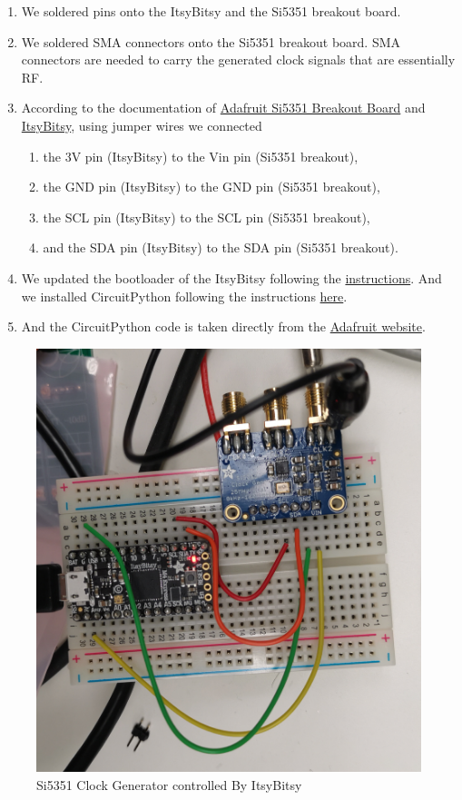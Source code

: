 \documentclass{article}
\begin{document}
\begin{enumerate}
    \item We soldered pins onto the ItsyBitsy and the Si5351 breakout board.
    \item We soldered SMA connectors onto the Si5351 breakout board.
          SMA connectors are needed to carry the generated clock signals that are essentially RF.
    \item According to the documentation of \href{https://learn.adafruit.com/adafruit-si5351-clock-generator-breakout/pinouts}{Adafruit Si5351 Breakout Board} and \href{https://cdn-learn.adafruit.com/downloads/pdf/introducing-adafruit-itsybitsy-m4.pdf}{ItsyBitsy}, using jumper wires we connected
          \begin{enumerate}
              \item the 3V pin (ItsyBitsy) to the Vin pin (Si5351 breakout),
              \item the GND pin (ItsyBitsy) to the GND pin (Si5351 breakout),
              \item the SCL pin (ItsyBitsy) to the SCL pin (Si5351 breakout),
              \item and the SDA pin (ItsyBitsy) to the SDA pin (Si5351 breakout).
          \end{enumerate}
    \item We updated the bootloader of the ItsyBitsy following the \href{https://learn.adafruit.com/introducing-adafruit-itsybitsy-m4/update-the-uf2-bootloader}{instructions}.
          And we installed CircuitPython following the instructions \href{https://learn.adafruit.com/introducing-adafruit-itsybitsy-m4/circuitpython}{here}.
    \item And the CircuitPython code is taken directly from the \href{https://learn.adafruit.com/adafruit-si5351-clock-generator-breakout/circuitpython}{Adafruit website}.
\end{enumerate}

\begin{figure}[h]
    \centering
    \includegraphics[width=.4\linewidth]{./pics/itsybitsy_si5351.jpg}
    \caption{Si5351 Clock Generator controlled By ItsyBitsy}
    \label{fig:assembly}
\end{figure}
\end{document}
